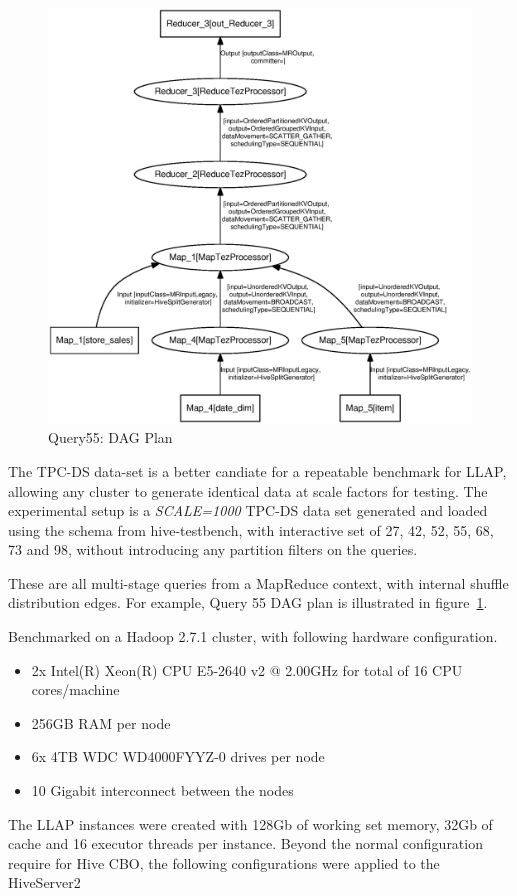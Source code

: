 \begin{figure}[bthp]
\centering
\includegraphics[width=0.8\columnwidth]{figures/q55.eps}
\caption{Query55: DAG Plan}
\label{fig:q55}
\end{figure} 

The TPC-DS data-set is a better candiate for a repeatable benchmark for LLAP, allowing any cluster to generate
identical data at scale factors for testing. The experimental setup is a \emph{SCALE=1000} TPC-DS data set generated
and loaded using the schema from hive-testbench\cite{testbench}, with interactive set of 27, 42, 52, 55, 68, 73 and 98, 
without introducing any partition filters on the queries.

These are all multi-stage queries from a MapReduce context, with internal shuffle distribution edges. For example, 
Query 55 DAG plan is illustrated in figure~\ref{fig:q55}.  

Benchmarked on a Hadoop 2.7.1 cluster, with following hardware configuration.

\begin{itemize}
\item 2x Intel(R) Xeon(R) CPU E5-2640 v2 @ 2.00GHz for total of 16 CPU cores/machine
\item 256GB RAM per node
\item 6x 4TB WDC WD4000FYYZ-0 drives per node
\item 10 Gigabit interconnect between the nodes
\end{itemize}

The LLAP instances were created with 128Gb of working set memory, 32Gb of cache and 16 executor threads per
instance. Beyond the normal configuration require for Hive CBO, the following configurations were applied to
the HiveServer2

